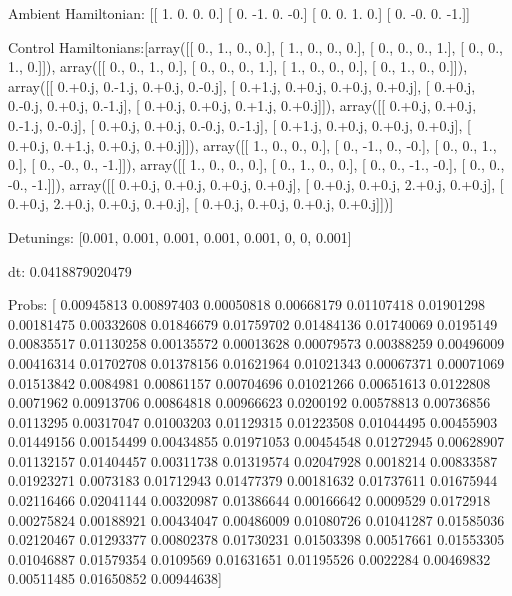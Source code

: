 \documentclass{article}
\begin{document}
    

\newpage

Ambient Hamiltonian: [[ 1.  0.  0.  0.]
 [ 0. -1.  0. -0.]
 [ 0.  0.  1.  0.]
 [ 0. -0.  0. -1.]]

Control Hamiltonians:[array([[ 0.,  1.,  0.,  0.],
       [ 1.,  0.,  0.,  0.],
       [ 0.,  0.,  0.,  1.],
       [ 0.,  0.,  1.,  0.]]), array([[ 0.,  0.,  1.,  0.],
       [ 0.,  0.,  0.,  1.],
       [ 1.,  0.,  0.,  0.],
       [ 0.,  1.,  0.,  0.]]), array([[ 0.+0.j,  0.-1.j,  0.+0.j,  0.-0.j],
       [ 0.+1.j,  0.+0.j,  0.+0.j,  0.+0.j],
       [ 0.+0.j,  0.-0.j,  0.+0.j,  0.-1.j],
       [ 0.+0.j,  0.+0.j,  0.+1.j,  0.+0.j]]), array([[ 0.+0.j,  0.+0.j,  0.-1.j,  0.-0.j],
       [ 0.+0.j,  0.+0.j,  0.-0.j,  0.-1.j],
       [ 0.+1.j,  0.+0.j,  0.+0.j,  0.+0.j],
       [ 0.+0.j,  0.+1.j,  0.+0.j,  0.+0.j]]), array([[ 1.,  0.,  0.,  0.],
       [ 0., -1.,  0., -0.],
       [ 0.,  0.,  1.,  0.],
       [ 0., -0.,  0., -1.]]), array([[ 1.,  0.,  0.,  0.],
       [ 0.,  1.,  0.,  0.],
       [ 0.,  0., -1., -0.],
       [ 0.,  0., -0., -1.]]), array([[ 0.+0.j,  0.+0.j,  0.+0.j,  0.+0.j],
       [ 0.+0.j,  0.+0.j,  2.+0.j,  0.+0.j],
       [ 0.+0.j,  2.+0.j,  0.+0.j,  0.+0.j],
       [ 0.+0.j,  0.+0.j,  0.+0.j,  0.+0.j]])]

Detunings: [0.001, 0.001, 0.001, 0.001, 0.001, 0, 0, 0.001]

 dt: 0.0418879020479

Probs: [ 0.00945813  0.00897403  0.00050818  0.00668179  0.01107418  0.01901298
  0.00181475  0.00332608  0.01846679  0.01759702  0.01484136  0.01740069
  0.0195149   0.00835517  0.01130258  0.00135572  0.00013628  0.00079573
  0.00388259  0.00496009  0.00416314  0.01702708  0.01378156  0.01621964
  0.01021343  0.00067371  0.00071069  0.01513842  0.0084981   0.00861157
  0.00704696  0.01021266  0.00651613  0.0122808   0.0071962   0.00913706
  0.00864818  0.00966623  0.0200192   0.00578813  0.00736856  0.0113295
  0.00317047  0.01003203  0.01129315  0.01223508  0.01044495  0.00455903
  0.01449156  0.00154499  0.00434855  0.01971053  0.00454548  0.01272945
  0.00628907  0.01132157  0.01404457  0.00311738  0.01319574  0.02047928
  0.0018214   0.00833587  0.01923271  0.0073183   0.01712943  0.01477379
  0.00181632  0.01737611  0.01675944  0.02116466  0.02041144  0.00320987
  0.01386644  0.00166642  0.0009529   0.0172918   0.00275824  0.00188921
  0.00434047  0.00486009  0.01080726  0.01041287  0.01585036  0.02120467
  0.01293377  0.00802378  0.01730231  0.01503398  0.00517661  0.01553305
  0.01046887  0.01579354  0.0109569   0.01631651  0.01195526  0.0022284
  0.00469832  0.00511485  0.01650852  0.00944638]
\end{document}
